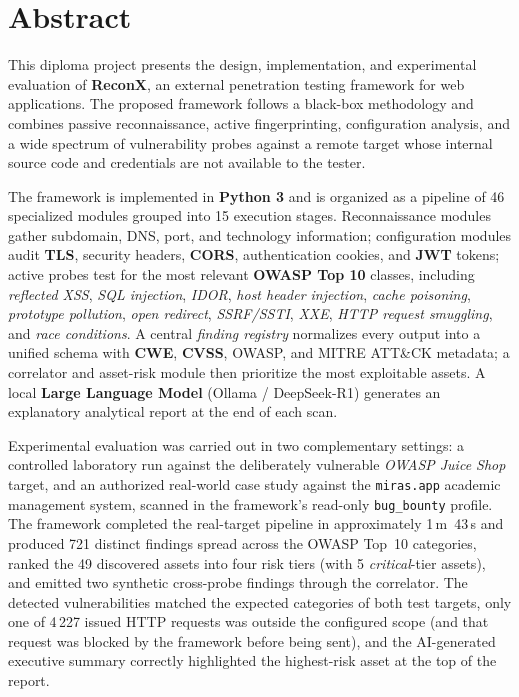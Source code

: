 \chapter{Abstract}
\begin{SingleSpace}
This diploma project presents the design, implementation, and experimental evaluation of \textbf{ReconX}, an external penetration testing framework for web applications. The proposed framework follows a black-box methodology and combines passive reconnaissance, active fingerprinting, configuration analysis, and a wide spectrum of vulnerability probes against a remote target whose internal source code and credentials are not available to the tester.

The framework is implemented in \textbf{Python 3} and is organized as a pipeline of 46 specialized modules grouped into 15 execution stages. Reconnaissance modules gather subdomain, DNS, port, and technology information; configuration modules audit \textbf{TLS}, security headers, \textbf{CORS}, authentication cookies, and \textbf{JWT} tokens; active probes test for the most relevant \textbf{OWASP Top 10} classes, including \textit{reflected XSS}, \textit{SQL injection}, \textit{IDOR}, \textit{host header injection}, \textit{cache poisoning}, \textit{prototype pollution}, \textit{open redirect}, \textit{SSRF/SSTI}, \textit{XXE}, \textit{HTTP request smuggling}, and \textit{race conditions}. A central \textit{finding registry} normalizes every output into a unified schema with \textbf{CWE}, \textbf{CVSS}, OWASP, and MITRE ATT\&CK metadata; a correlator and asset-risk module then prioritize the most exploitable assets. A local \textbf{Large Language Model} (Ollama / DeepSeek-R1) generates an explanatory analytical report at the end of each scan.

Experimental evaluation was carried out in two complementary settings: a controlled laboratory run against the deliberately vulnerable \textit{OWASP Juice Shop} target, and an authorized real-world case study against the \texttt{miras.app} academic management system, scanned in the framework's read-only \texttt{bug\_bounty} profile. The framework completed the real-target pipeline in approximately 1\,m~43\,s and produced 721 distinct findings spread across the OWASP Top~10 categories, ranked the 49 discovered assets into four risk tiers (with 5 \textit{critical}-tier assets), and emitted two synthetic cross-probe findings through the correlator. The detected vulnerabilities matched the expected categories of both test targets, only one of 4\,227 issued HTTP requests was outside the configured scope (and that request was blocked by the framework before being sent), and the AI-generated executive summary correctly highlighted the highest-risk asset at the top of the report.


\end{SingleSpace}
